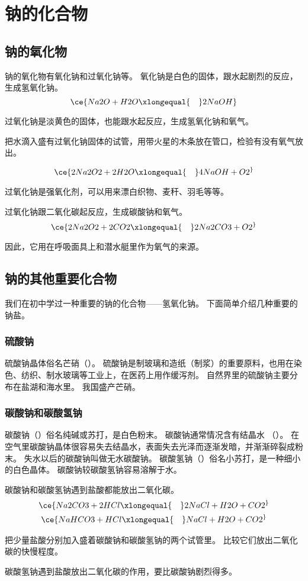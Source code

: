 \section{钠的化合物}
\subsection{钠的氧化物}
钠的氧化物有氧化钠和过氧化钠等。
氧化钠是白色的固体，跟水起剧烈的反应，生成氢氧化钠。
\[ \ce{ Na2O + H2O \xlongequal{\quad} 2NaOH }\]

过氧化钠是淡黄色的固体，也能跟水起反应，生成氢氧化钠和氧气。
\begin{Experiment}
把水滴入盛有过氧化钠固体的试管，用带火星的木条放在管口，检验有没有氧气放出。
\end{Experiment}
\[ \ce{ 2Na2O2 + 2H2O \xlongequal{\quad} 4NaOH + O2 ^ }\]

过氧化钠是强氧化剂，可以用来漂白织物、麦秆、羽毛等等。

过氧化钠跟二氧化碳起反应，生成碳酸钠和氧气。
\[ \ce{ 2Na2O2 + 2CO2 \xlongequal{\quad} 2Na2CO3 + O2 ^ }\]

因此，它用在呼吸面具上和潜水艇里作为氧气的来源。

\subsection{钠的其他重要化合物}
我们在初中学过一种重要的钠的化合物——氢氧化钠。
下面简单介绍几种重要的钠盐。
\subsubsection{硫酸钠}

硫酸钠晶体俗名芒硝（）。
硫酸钠是制玻璃和造纸（制浆）的重要原料，也用在染色、纺织、制水玻璃等工业上，在医药上用作缓泻剂。
自然界里的硫酸钠主要分布在盐湖和海水里。
我国盛产芒硝。

\subsubsection{碳酸钠和碳酸氢钠}
碳酸钠（）俗名纯碱或苏打，是白色粉末。
碳酸钠通常情况含有结晶水 （）。
在空气里碳酸钠晶体很容易失去结晶水，表面失去光泽而逐渐发暗，并渐渐碎裂成粉末。
失水以后的碳酸钠叫做无水碳酸钠。
碳酸氢钠（）俗名小苏打，是一种细小的白色晶体。
碳酸钠较碳酸氢钠容易溶解于水。

碳酸钠和碳酸氢钠遇到盐酸都能放出二氧化碳。
\begin{gather*}
\ce{Na2CO3 + 2HCl \xlongequal{\quad} 2NaCl + H2O + CO2 ^} \\
\ce{NaHCO3 + HCl \xlongequal{\quad} NaCl + H2O + CO2 ^} 
\end{gather*}
\begin{Experiment}
把少量盐酸分别加入盛着碳酸钠和碳酸氢钠的两个试管里。
比较它们放出二氧化碳的快慢程度。
\end{Experiment}
碳酸氢钠遇到盐酸放出二氧化碳的作用，要比碳酸钠剧烈得多。

